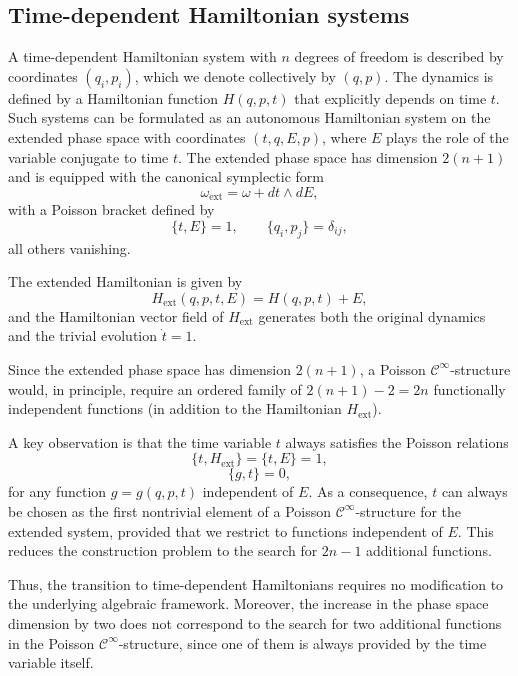 \documentclass{article}
\theoremstyle{remark}
\theoremstyle{definition}
\newcommand{\cinf}{$\mathcal{C}^{\infty}$}
\begin{document}
\subsection{Time-dependent Hamiltonian systems}\label{sec:time-dependent}

A time-dependent Hamiltonian system with $n$ degrees of freedom is described by coordinates $(q_i,p_i)$, which we denote collectively by $(q,p)$. The dynamics is defined by a Hamiltonian function $H(q,p,t)$ that explicitly depends on time $t$. Such systems can be formulated as an autonomous Hamiltonian system on the extended phase space
with coordinates $(t,q,E,p)$, where $E$ plays the role of the variable conjugate to
time $t$. The extended phase space has dimension $2(n+1)$ and is equipped with the canonical symplectic form
\[
\omega_{\mathrm{ext}} = \omega+dt \wedge dE,
\]
with a Poisson bracket defined by
\[
\{t,E\}=1,\qquad \{q_i,p_j\}=\delta_{ij},
\]
all others vanishing. 

The extended Hamiltonian is given by
\[
H_{\mathrm{ext}}(q,p,t,E)=H(q,p,t)+E,
\]
and the Hamiltonian vector field of $H_{\mathrm{ext}}$
generates both the original dynamics and the trivial evolution
$\dot t=1$.

Since the extended phase space has dimension $2(n+1)$, a Poisson
\cinf-structure would, in
principle, require an ordered family of $2(n+1)-2=2n$ functionally
independent functions (in addition to the Hamiltonian $H_{\mathrm{ext}}$).

A key observation is that the time variable $t$ always satisfies the Poisson relations
\[
\{t,H_{\mathrm{ext}}\}=\{t,E\}=1,
\]
\[
\{g,t\}=0,
\]
for any function $g=g(q,p,t)$ independent of $E$.
As a consequence, $t$ can always be chosen as the first nontrivial
element of a Poisson \cinf-structure for the extended system, provided that we restrict to functions independent of $E$. This
reduces the construction problem to the search for $2n-1$
additional functions.


Thus, the transition to time-dependent Hamiltonians requires no modification to the underlying algebraic framework. Moreover, the increase in the phase space dimension by two does not correspond to the search for two additional functions in the Poisson \cinf-structure, since one of them is always provided by the time variable itself.
\end{document}
